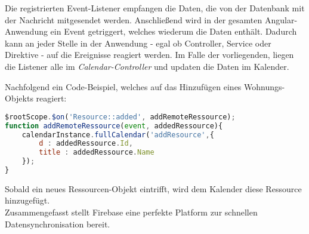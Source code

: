 Die registrierten Event-Listener empfangen die Daten, die von der Datenbank mit der Nachricht mitgesendet werden.
Anschließend wird in der gesamten Angular-Anwendung ein Event getriggert, welches wiederum die Daten enthält.
Dadurch kann an jeder Stelle in der Anwendung - egal ob Controller, Service oder Direktive - auf die Ereignisse reagiert werden.
Im Falle der vorliegenden, liegen die Listener alle im \textit{Calendar-Controller} und updaten die Daten im Kalender.

Nachfolgend ein Code-Beispiel, welches auf das Hinzufügen eines Wohnungs-Objekts reagiert:

 \begin{lstlisting}[language=Javascript, label=code_CollectionCUtomListener, caption=Event-Handler für hinzukommende Ressourcen]
 $rootScope.$on('Resource::added', addRemoteRessource);
function addRemoteRessource(event, addedRessource){
    calendarInstance.fullCalendar('addResource',{
        d : addedRessource.Id,
        title : addedRessource.Name
    });
}
\end{lstlisting}

Sobald ein neues Ressourcen-Objekt eintrifft, wird dem Kalender diese Ressource hinzugefügt.\\

Zusammengefasst stellt Firebase eine perfekte Platform zur schnellen Datensynchronisation bereit.
